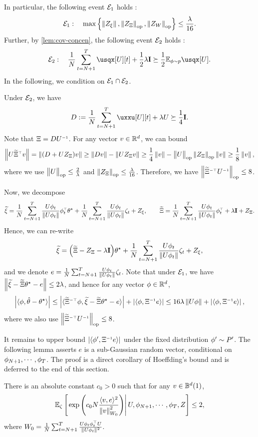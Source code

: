 In particular, the following event $\mathcal{E}_1$ holds :
\begin{align*}
    \mathcal{E}_1:\quad \max\left\{ \left\|Z_\xi\right\|, \left\|Z_\Xi\right\|_{\rm op}, \left\|Z_W\right\|_{\rm op}  \right\}\leq \frac{\lambda}{16}.
\end{align*}
Further, by \cref{lem:cov-concen}, the following event $\mathcal{E}_2$ holds :
\begin{align*}
    \cE_2: \quad \avgtt \usqx[U][t]+\frac12\lambda\id\succeq \frac12 \Epp{\usqx[U]}.
\end{align*}
In the following, we condition on $\mathcal{E}_1\cap \mathcal{E}_2$.

Under $\mathcal{E}_2$, we have
\begin{align*}
    D:=\avgtt \uxxu[U][t]+\lambda U \succeq \frac14\id.
\end{align*}
Note that $\Xi=DU^{{\scriptscriptstyle-1}}$. For any vector $v\in\mathbb{R}^d$, we can bound
\begin{align*}
    \left\|U{\widetilde \Xi}^{{\scriptscriptstyle\top}} v\right\|
    =\left\| (D+U Z_\Xi)v  \right\| 
    \geq \left\|Dv\right\|- \left\|U Z_\Xi v\right\|
    \geq \frac{1}{4}\left\|v\right\|-\big\|U\big\|_{\mathrm{op}}\left\|Z_\Xi\right\|_{\rm op}\left\|v\right\|\geq \frac18\left\|v\right\|,
\end{align*}
where we use $\big\|U\big\|_{\mathrm{op}}\leq \frac{2}{\lambda}$ and $\left\|Z_\Xi\right\|_{\rm op}\leq \frac{\lambda}{16}$. Therefore, we have $\left\|{\widetilde \Xi}^{{\scriptscriptstyle-\top}} U^{{\scriptscriptstyle-1}}\right\|_{\rm op}\leq 8$.

Now, we decompose
\begin{align*}
    \widetilde \xi=\frac{1}{N}\sum_{t=N+1}^T \frac{U\phi_t}{\|U\phi_t\|}\phi_t^{{\scriptscriptstyle\top}} \theta^\star + \frac{1}{N}\sum_{t=N+1}^T \frac{U\phi_t}{\|U\phi_t\|}\zeta_t+Z_\xi,
    \qquad
    \widetilde \Xi=\frac{1}{N}\sum_{t=N+1}^T \frac{U\phi_t}{\|U\phi_t\|}\phi_t^{{\scriptscriptstyle\top}}+\lambda\mathbf{I}+Z_\Xi.
\end{align*}
Hence, we can re-write
\begin{align*}
    \widetilde \xi={\left(  \widetilde \Xi-Z_\Xi-\lambda\mathbf{I}  \right)}\theta^\star + \frac{1}{N}\sum_{t=N+1}^T \frac{U\phi_t}{\|U\phi_t\|}\zeta_t+Z_\xi,
\end{align*}
and we denote $e=\frac{1}{N}\sum_{t=N+1}^T \frac{U\phi_t}{\|U\phi_t\|}\zeta_t$.
Note that under $\mathcal{E}_1$, we have $\left\| \widetilde \xi -\widetilde \Xi \theta^\star- e\right\| \leq 2\lambda$, and hence for any vector $\phi\in\mathbb{R}^d$,
\begin{align*}
\left|\langle \phi, \hat{\theta}-\theta^\star \rangle\right|\leq \left|\langle {\widetilde\Xi}^{{\scriptscriptstyle-\top}} \phi, \widetilde \xi -\widetilde \Xi \theta^\star- e \rangle\right|  + \left|\langle \phi, \Xi^{{\scriptscriptstyle-1}} e \rangle \right| \leq 16\lambda\left\|U \phi\right\|+\left|\langle \phi, \Xi^{{\scriptscriptstyle-1}} e \rangle \right|,
\end{align*}
where we also use $\left\|{\widetilde \Xi}^{{\scriptscriptstyle-\top}} U^{{\scriptscriptstyle-1}}\right\|_{\rm op}\leq 8$.

It remains to upper bound $\left|\langle \phi', \Xi^{{\scriptscriptstyle-1}} e \rangle \right|$ under the fixed distribution $\phi'\sim P'$.
The following lemma asserts $e$ is a sub-Gaussian random vector, conditional on $\phi_{N+1},\cdots,\phi_T$. The proof is a direct corollary of Hoeffding's bound and is deferred to the end of this section.
\begin{lemma}\label{lem:sub-Gaussian-empirical}
There is an absolute constant $c_0>0$ such that for any $v\in\mathbb{B}^d(1)$,
\begin{align*}
    \mathbb{E}_\zeta\left[\left. \exp{\left(  c_0N\frac{\langle v,e\rangle^2}{\left\|v\right\|_{W_0}^2}  \right)} \right|U,\phi_{N+1},\cdots,\phi_T,Z\right]\leq 2,
\end{align*}
where $W_0=\frac{1}{N}\sum_{t=N+1}^T \frac{U\phi_t \phi_t^{{\scriptscriptstyle\top}} U}{\|U\phi_t\|^2}$.
\end{lemma}

